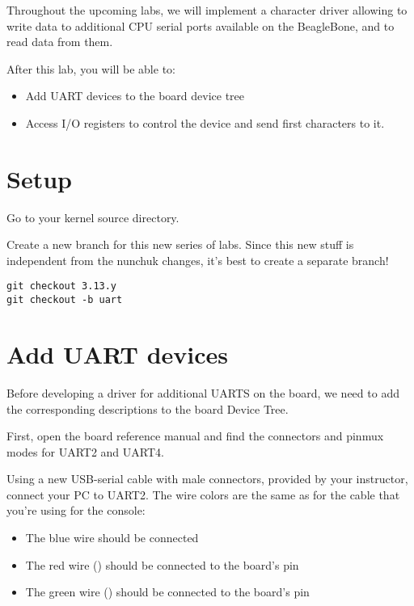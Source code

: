 
Throughout the upcoming labs, we will implement a character driver
allowing to write data to additional CPU serial ports available on
the BeagleBone, and to read data from them.

After this lab, you will be able to:

\begin{itemize}
\item Add UART devices to the board device tree
\item Access I/O registers to control the device and
      send first characters to it.
\end{itemize}

\section{Setup}

Go to your kernel source directory.

Create a new branch for this new series of labs. Since this new stuff
is independent from the nunchuk changes, it's best to create a separate
branch!

\begin{verbatim}
git checkout 3.13.y
git checkout -b uart
\end{verbatim}

\section{Add UART devices}

Before developing a driver for additional UARTS on the board, we
need to add the corresponding descriptions to the board Device Tree.

First, open the board reference manual and find the connectors
and pinmux modes for UART2 and UART4.

Using a new USB-serial cable with male connectors, provided by your
instructor, connect your PC to UART2. The wire colors are the same
as for the cable that you're using for the console:

\begin{itemize}
\item The blue wire should be connected  
\item The red wire () should be connected to the board's  pin
\item The green wire () should be connected to the board's  pin
\end{itemize}

